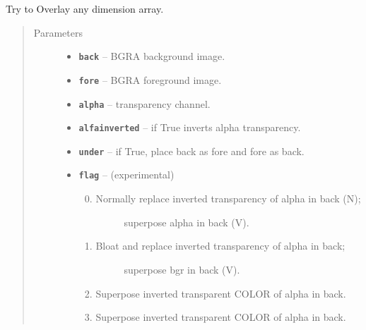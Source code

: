 \documentclass[letterpaper,10pt,english]{sphinxmanual}
\begin{document}
\begin{fulllineitems}
\label{RRtoolbox.lib.arrayops:RRtoolbox.lib.arrayops.basic.overlay}
Try to Overlay any dimension array.
\begin{quote}\begin{description}
\item[{Parameters}] \leavevmode\begin{itemize}
\item {} 
\textbf{\texttt{back}} -- BGRA background image.

\item {} 
\textbf{\texttt{fore}} -- BGRA foreground image.

\item {} 
\textbf{\texttt{alpha}} -- transparency channel.

\item {} 
\textbf{\texttt{alfainverted}} -- if True inverts alpha transparency.

\item {} 
\textbf{\texttt{under}} -- if True, place back as fore and fore as back.

\item {} 
\textbf{\texttt{flag}} -- 
(experimental)
\begin{enumerate}
\setcounter{enumi}{-1}
\item {} \begin{description}
\item[{Normally replace inverted transparency of alpha in back (N);}] \leavevmode
superpose alpha in back (V).

\end{description}

\item {} \begin{description}
\item[{Bloat and replace inverted transparency of alpha in back;}] \leavevmode
superpose bgr in back (V).

\end{description}

\item {} 
Superpose inverted transparent COLOR of alpha in back.

\item {} 
Superpose inverted transparent COLOR of alpha in back.


\end{enumerate}
\end{itemize}
\end{description}
\end{quote}
\end{fulllineitems}
\end{document}
